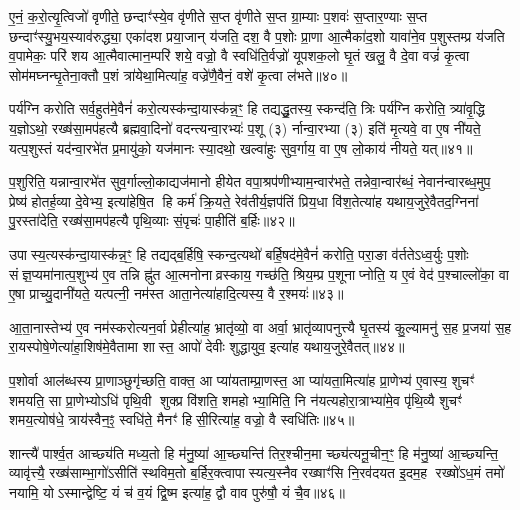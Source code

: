 ए॒नं॒ क॒रो॒त्यृ॒त्विजो॑ वृणीते॒ छन्दाꣳ॑स्ये॒व वृ॑णीते स॒प्त वृ॑णीते स॒प्त ग्रा॒म्याः प॒शवः॑ स॒प्तार॒ण्याः स॒प्त छन्दाꣳ॑स्यु॒भय॒स्याव॑रुद्ध्या॒ एका॑दश प्रया॒जान् य॑जति॒ दश॒ वै प॒शोः प्रा॒णा आ॒त्मैका॑द॒शो यावा॑ने॒व प॒शुस्तम्प्र य॑जति व॒पामेकः॒ परि॑ शय आ॒त्मैवात्मान॒म्परि॑ शये॒ वज्रो॒ वै स्वधि॑ति॒र्वज्रो॑ यूपशक॒लो घृ॒तं खलु॒ वै दे॒वा वज्रं॑ कृ॒त्वा सोम॑मघ्नन्घृ॒तेना॒क्तौ प॒शं त्रा॑येथा॒मित्या॑ह॒ वज्रे॑णै॒वैनं॒ वशे॑ कृ॒त्वा ल॑भते॥४०॥

{\anuvakamend[{आ॒घा॒रम्प॑द्यन्ते॒ द्वाद॑शा॒त्मन्ने॒व य॒ज्ञस्य॒ मेध्य॑मे॒व खलु॒ वा अ॒ष्टाद॑श च॥७॥}]}

पर्य॑ग्नि करोति सर्व॒हुत॑मे॒वैनं॑ करो॒त्यस्क॑न्दा॒यास्क॑न्न॒ꣳ॒ हि तद्यद्धु॒तस्य॒ स्कन्द॑ति॒ त्रिः पर्य॑ग्नि करोति॒ त्र्या॑वृ॒द्धि य॒ज्ञोऽथो॒ रख्ष॑सा॒मप॑हत्यै ब्रह्मवा॒दिनो॑ वदन्त्यन्वा॒रभ्यः॑ प॒शू (३) र्नान्वा॒रभ्या (३) इति॑ मृ॒त्यवे॒ वा ए॒ष नी॑यते॒ यत्प॒शुस्तं यद॑न्वा॒रभे॑त प्र॒मायु॑को॒ यज॑मानः स्या॒दथो॒ खल्वा॑हुः सुव॒र्गाय॒ वा ए॒ष लो॒काय॑ नीयते॒ यत्॥४१॥

प॒शुरिति॒ यन्नान्वा॒रभे॑त सुव॒र्गाल्लो॒काद्यज॑मानो हीयेत वपा॒श्रप॑णीभ्याम॒न्वार॑भते॒ तन्नेवा॒न्वार॑ब्धं॒ नेवान॑न्वारब्ध॒मुप॒ प्रेष्य॑ होतर्\mbox{}ह॒व्या दे॒वेभ्य॒ इत्या॑हेषि॒त हि कर्म॑ क्रि॒यते॒ रेव॑तीर्य॒ज्ञप॑तिं प्रिय॒धा वि॑श॒तेत्या॑ह यथाय॒जुरे॒वैतद॒ग्निना॑ पु॒रस्ता॑देति॒ रख्ष॑सा॒मप॑हत्यै पृथि॒व्याः सं॒पृचः॑ पा॒हीति॑ ब॒र्\mbox{}हिः॥४२॥

उपास्य॒त्यस्क॑न्दा॒यास्क॑न्न॒ꣳ॒ हि तद्यद्ब॒र्\mbox{}हिषि॒ स्कन्द॒त्यथो॑ बर्\mbox{}हि॒षद॑मे॒वैनं॑ करोति॒ परा॒ङा व॑र्ततेऽध्व॒र्युः प॒शोः संज्ञ॒प्यमा॑नात्प॒शुभ्य॑ ए॒व तन्नि ह्नु॑त आ॒त्मनोनाव्रस्काय॒ गच्छ॑ति॒ श्रिय॒म्प्र प॒शूनाप्नोति॒ य ए॒वं वेद॑ प॒श्चाल्लो॑का॒ वा ए॒षा प्राच्यु॒दानी॑यते॒ यत्पत्नी॒ नम॑स्त आता॒नेत्या॑हादि॒त्यस्य॒ वै र॒श्मयः॑॥४३॥

आ॒ता॒नास्तेभ्य॑ ए॒व नम॑स्करोत्यन॒र्वा प्रेहीत्या॑ह॒ भ्रातृ॑व्यो॒ वा अर्वा॒ भ्रातृ॑व्यापनुत्त्यै घृ॒तस्य॑ कु॒ल्यामनु॑ स॒ह प्र॒जया॑ स॒ह रा॒यस्पोषे॒णेत्या॑हा॒शिष॑मे॒वैतामा शास्त॒ आपो॑ देवीः शुद्धायुव॒ इत्या॑ह यथाय॒जुरे॒वैतत्॥४४॥

{\anuvakamend[{लो॒काय॑ नीयते॒ यद्ब॒र्\mbox{}ही र॒श्मयः॑ स॒प्तत्रिꣳ॑शच्च॥८॥}]}

प॒शोर्वा आल॑ब्धस्य प्रा॒णाञ्छुगृ॑च्छति॒ वाक्त॒ आ प्या॑यताम्प्रा॒णस्त॒ आ प्या॑यता॒मित्या॑ह प्रा॒णेभ्य॑ ए॒वास्य॒ शुचꣳ॑ शमयति॒ सा प्रा॒णेभ्योऽधि॑ पृथि॒वी शुक्प्र वि॑शति॒ शमहोभ्या॒मिति॒ नि न॑यत्यहोरा॒त्राभ्या॑मे॒व पृ॑थि॒व्यै शुचꣳ॑ शमय॒त्योष॑धे॒ त्राय॑स्वैन॒ꣵ॒ स्वधि॑ते॒ मैनꣳ॑ हिसी॒रित्या॑ह॒ वज्रो॒ वै स्वधि॑तिः॥४५॥

शान्त्यै॑ पार्श्व॒त आच्छ्य॑ति मध्य॒तो हि म॑नु॒ष्या॑ आ॒च्छ्यन्ति॑ तिर॒श्चीन॒मा च्छ्य॑त्यनू॒चीन॒ꣳ॒ हि म॑नु॒ष्या॑ आ॒च्छ्यन्ति॒ व्यावृ॑त्त्यै॒ रख्ष॑साम्भा॒गो॑ऽसीति॑ स्थविम॒तो ब॒र्\mbox{}हिर॒क्त्वापास्यत्य॒स्नैव रख्षाꣳ॑सि नि॒रव॑दयत इ॒दम॒ह रख्षो॑ऽध॒मं तमो॑ नयामि॒ योऽस्मान्द्वेष्टि॒ यं च॑ व॒यं द्वि॒ष्म इत्या॑ह॒ द्वौ वाव पुरु॑षौ॒ यं चै॒व॥४६॥

